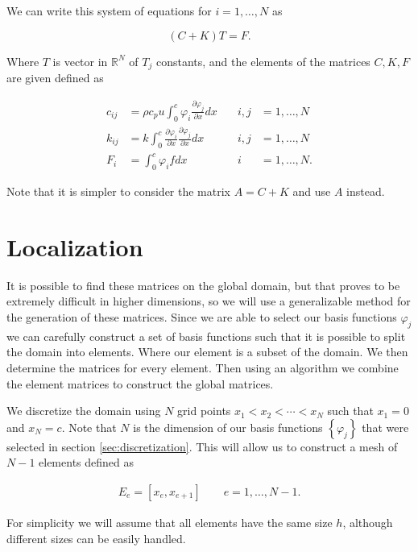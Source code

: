 \documentclass[10pt]{amsart}
\numberwithin{equation}{section}
\theoremstyle{definition}
\newcommand{\pder}[2][]{\frac{\partial#1}{\partial#2}}
\newcommand{\R}{\mathbb{R}}
\begin{document}
\begin{multicols}{2}
  We can write this system of equations for $i=1,\ldots,N$ as

  \begin{equation}\label{eq:matrix}
    (C+K)T=F.
  \end{equation}

  Where $T$ is vector in $\R^N$ of $T_j$ constants, and the elements of the
  matrices $C,K,F$ are given defined as

  \begin{align*}
    c_{ij}&=\rho c_p u\int_0^c\varphi_i\pder[\varphi_j]{x}dx\quad &i,j&=1,\ldots,N\\
    k_{ij}&=k\int_0^c\pder[\varphi_i]{x}\pder[\varphi_j]{x}dx\quad &i,j&=1,\ldots,N\\
    F_i&=\int_0^c\varphi_ifdx &i&=1,\ldots,N.
  \end{align*}

  Note that it is simpler to consider the matrix $A=C+K$ and use $A$ instead.

  \section{Localization}%
  \label{sec:localization}

  It is possible to find these matrices on the global domain, but that proves to
  be extremely difficult in higher dimensions, so we will use a generalizable
  method for the generation of these matrices. Since we are able to select our
  basis functions $\varphi_j$ we can carefully construct a set of basis
  functions such that it is possible to split the domain into elements. Where
  our element is a subset of the domain. We then determine the matrices for
  every element. Then using an algorithm we combine the element matrices to
  construct the global matrices.

  We discretize the domain using $N$ grid points $x_1<x_2<\cdots<x_N$ such that
  $x_1=0$ and $x_N=c$. Note that $N$ is the dimension of our basis functions
  $\left\{\varphi_j\right\}$ that were selected in section \ref{sec:discretization}. This will allow us to construct a mesh of $N-1$ elements
  defined as

  \begin{align*}
    E_e=\left[x_e,x_{e+1}\right]\quad\quad e=1,\ldots,N-1.
  \end{align*}

  For simplicity we will assume that all elements have the same size $h$,
  although different sizes can be easily handled.


\end{multicols}
\end{document}
